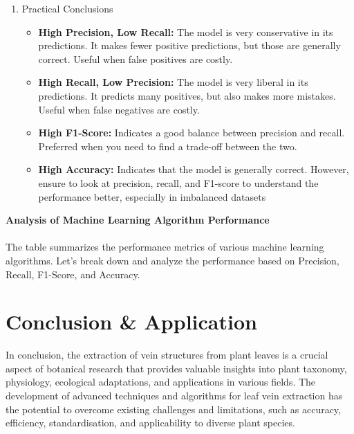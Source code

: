 \documentclass{report}
\begin{document}
{\begin{enumerate}
\begin{itemize}
        \item \textbf{Formula:}:Accuracy=TP+TNTP+TN+FP+FN = /frac{TP + TN}{TP + TN + FP + FN}Accuracy=TP+TN+FP+FNTP+TN
        TN: True Negatives
        
        \item \textbf{Conclusion:} Accuracy is a good metric when the classes are balanced. However, in cases of imbalanced classes, it might be misleading. For example, if 95\% of the samples are negative and 5%
    \end{itemize}
    \item Practical Conclusions
    \begin{itemize}
        \item \textbf{High Precision, Low Recall:} The model is very conservative in its predictions. It makes fewer positive predictions, but those are generally correct. Useful when false positives are costly.
        
        \item \textbf{High Recall, Low Precision: } The model is very liberal in its predictions. It predicts many positives, but also makes more mistakes. Useful when false negatives are costly.
        
        \item \textbf{High F1-Score: }Indicates a good balance between precision and recall. Preferred when you need to find a trade-off between the two.
        
        \item \textbf{High Accuracy: }Indicates that the model is generally correct. However, ensure to look at precision, recall, and F1-score to understand the performance better, especially in imbalanced datasets
    \end{itemize}
\end{enumerate}

\textbf{Analysis of Machine Learning Algorithm Performance}
\\\\
The table summarizes the performance metrics of various machine learning algorithms. Let's break down and analyze the performance based on Precision, Recall, F1-Score, and Accuracy.
\chapter{Conclusion \& Application}
\begin{justify}
In conclusion, the extraction of vein structures from plant leaves is a crucial aspect of botanical research that provides valuable insights into plant taxonomy, physiology, ecological adaptations, and applications in various fields. The development of advanced techniques and algorithms for leaf vein extraction has the potential to overcome existing challenges and limitations, such as accuracy, efficiency, standardisation, and applicability to diverse plant species.


\end{justify}}
\end{document}
